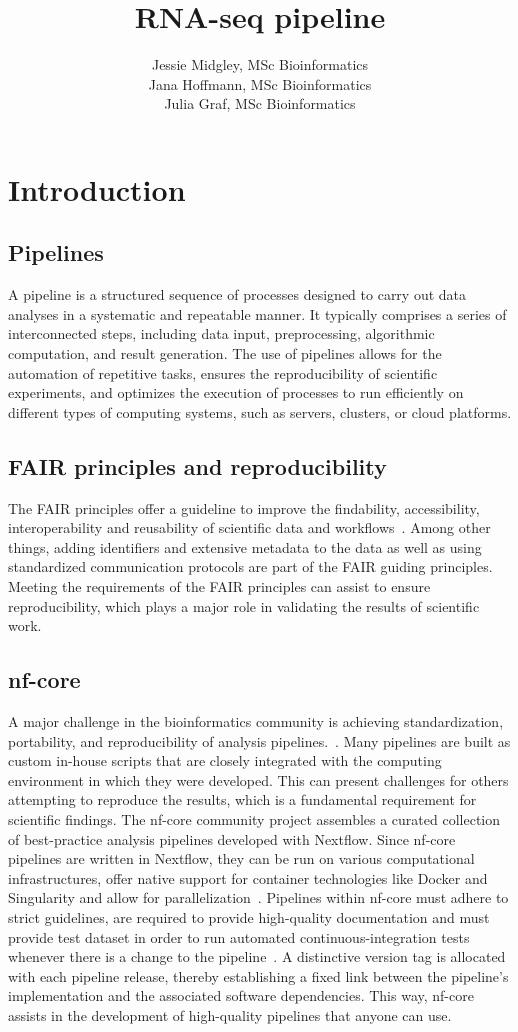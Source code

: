 \documentclass[12pt]{article}
\title{\textbf{RNA-seq pipeline}}
\author{Jessie Midgley, MSc Bioinformatics
\\ Jana Hoffmann, MSc Bioinformatics
\\ Julia Graf, MSc Bioinformatics}
\begin{document}
\maketitle



\section{Introduction}
\subsection{Pipelines}
A pipeline is a structured sequence of processes designed to carry out data analyses in a systematic and repeatable manner. It typically comprises a series of interconnected steps, including data input, preprocessing, algorithmic computation, and result generation. The use of pipelines allows for the automation of repetitive tasks, ensures the reproducibility of scientific experiments, and optimizes the execution of processes to run efficiently on different types of computing systems, such as servers, clusters, or cloud platforms.
\subsection{FAIR principles and reproducibility}
The FAIR principles offer a guideline to improve the findability, accessibility, interoperability and reusability of scientific data and workflows~\cite{wilkinson2016fair}. 
Among other things, adding identifiers and extensive metadata to the data as well as using standardized communication protocols are part of the FAIR guiding principles. Meeting the requirements of the FAIR principles can assist to ensure reproducibility, which plays a major role in validating the results of scientific work.
\subsection{nf-core}
A major challenge in the bioinformatics community is achieving standardization, portability, and reproducibility of analysis pipelines.~\cite{ewels2020nf}. Many pipelines are built as custom in-house scripts that are closely integrated with the computing environment in which they were developed. This can present challenges for others attempting to reproduce the results, which is a fundamental requirement for scientific findings. The nf-core community project assembles a curated collection of best-practice analysis pipelines developed with Nextflow. Since nf-core pipelines are written in Nextflow, they can be run on various computational infrastructures, offer native support for container technologies like Docker and Singularity and allow for parallelization~\cite{di2017nextflow}. Pipelines within nf-core must adhere to strict guidelines, are required to provide high-quality documentation and must provide test dataset in order to run automated continuous-integration tests whenever there is a change to the pipeline~\cite{ewels2020nf}. A distinctive version tag is allocated with each pipeline release, thereby establishing a fixed link between the pipeline's implementation and the associated software dependencies. This way, nf-core assists in the development of high-quality pipelines that anyone can use.
\end{document}
